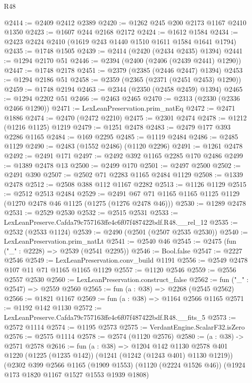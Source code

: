 \begin{lexlean}{R48}
\begin{coremodule}
@2414 := @2409 @2412 @2389
@2420 := @1262 @245 @200 @2173 @1167 @2410 @1350
@2423 := @1607 @244 @2168 @2172
@2424 := @1612 @1584
@2434 := @2423 @2424 @2410 (@1619 @243 @1440 @1510 @1611 @1584 @1641 @1794)
@2435 := @1748 @1505
@2439 := @2414 (@2420 (@2434 @2435) @1394)
@2441 := @1294 @2170 @51
@2446 := @2394 (@2400 (@2406 (@2439 @2441) @1290))
@2447 := @1748 @2178
@2451 := @2379 (@2385 (@2446 @2447) @1394)
@2453 := @1294 @2186 @51
@2458 := @2359 (@2365 (@2371 (@2451 @2453) @1290))
@2459 := @1748 @2194
@2463 := @2344 (@2350 (@2458 @2459) @1394)
@2465 := @1294 @2202 @51
@2466 := @2463 @2465
@2470 := @2313 (@2330 (@2336 @2466 @1290))
@2471 := LexLeanPreservation.prim_natEq
@2472 := @2471 @1886
@2474 := @2470 (@2472 @2210)
@2475 := @2301 @2474
@2478 := @1212 (@1216 @1125) @1219
@2479 := @1251 @2478
@2483 := @2479 @177 @393 @2286 @1165
@2484 := @169 @2295
@2485 := @1119 @2484
@2486 := @2485 @1129
@2490 := @2483 (@1552 @2486) (@1120 @2296)
@2491 := @1261 @2478
@2492 := @2491 @171
@2497 := @2492 @392 @1165 @2285 @170 @2486
@2499 := @1389 @2478 @13
@2500 := @2499 @170
@2501 := @2497 @2500
@2502 := @2491 @390
@2507 := @2502 @71 @2283 @1165 @2484 @1129
@2508 := @1339 @2478
@2512 := @2508 @388 @112 @1167 @2282
@2513 := @1126 @1129
@2515 := @2512 @2513 @2484
@2529 := @2491 @67 @71 @1165 @1165 @1125 @1129 (@1270 @2478 @46 @1125 (@1275 (@1276 @2478 @46)))
@2530 := @1289 @2478
@2531 := @2529 @2530
@2532 := @2515 @2531
@2533 := LexLeanPreserve.Cafda79c757163ffe4c6f07f487422bdf.R48.__rel_12
@2535 := @2532 (@2533 @1124)
@2539 := @2490 (@2501 (@2507 @2535 @2530))
@2540 := LexLeanPreservation.prim_natLt
@2541 := @2540 @46
@2545 := @2475 (fun ("_" : @2228) => @2539 (@2541 @2295))
@2546 := Bool.false
@2547 := @2227 @2546
@2549 := LexLeanPreservation.conv_build @1191
@2556 := @2549 @2478 @107 @11 @71 @1165 @1165 @1129
@2557 := @1120 @2546
@2559 := @2556 @2557 @2530
@2560 := LexLeanPreservation.construct_false
@2562 := fun ("_" : @2547) => @2559 @2560
@2565 := fun (a : @38) => @2268 (@2545 @2562)
@2566 := @1821 @1167
@2569 := fun (a : @38) => @1164 @2566 @1165
@2571 := @1192 @142 @1130
@2572 := LexLeanPreserve.Cafda79c757163ffe4c6f07f487422bdf.R48.__fits_5
@2573 := @2572 @1114
@2574 := @1195 @2573
@2575 := VerdantEngine.ScalarF32.isZero
@2576 := @2575 @1114
@2578 := @2574 (@1120 @2576)
@2580 := (a : @38) -> @2571 @2578
@2616 := fun (a : @38) =>
  @1204
    @142
    @1130
    @2578
    @401
    @1220
    (@1225 (@1235 @142))
    (@1241 (@1242 (@1243 @401) @1130 @1219))
    (@2302
      @399
      @2566
      @1165
      (@1909 @1553)
      (@1120 (@2224 @1526 @46))
      (@1924 @173 @1820 @1167 @1527 @1553 @1939 @1808)

\end{coremodule}
\end{lexlean}

